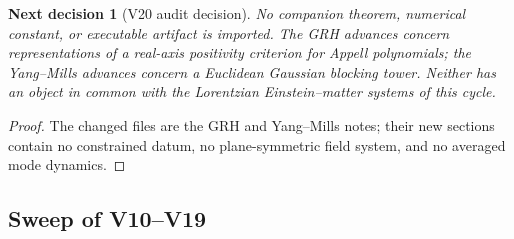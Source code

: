 \documentclass[11pt]{article}
\newtheorem{decision}[theorem]{Next decision}
\theoremstyle{remark}
\begin{document}
\begin{decision}[V20 audit decision]
\label{dec:v20v20-audit}
No companion theorem, numerical constant, or executable artifact is
imported.  The GRH advances concern representations of a real-axis
positivity criterion for Appell polynomials; the Yang--Mills advances
concern a Euclidean Gaussian blocking tower.  Neither has an object
in common with the Lorentzian Einstein--matter systems of this cycle.
\end{decision}

\begin{proof}
The changed files are the GRH and Yang--Mills notes; their new
sections contain no constrained datum, no plane-symmetric field
system, and no averaged mode dynamics.
\end{proof}

\subsection{Sweep of V10--V19}
\end{document}

